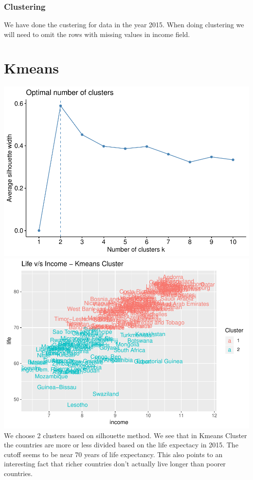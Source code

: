 \documentclass[]{article}
\begin{document}
\hypertarget{clustering}{%
\subsubsection{Clustering}\label{clustering}}

We have done the custering for data in the year 2015. When doing
clustering we will need to omit the rows with missing values in income
field.

\hypertarget{kmeans}{%
\section{Kmeans}\label{kmeans}}

\includegraphics{Final_Project_files/figure-latex/Clustering Kmeans-1.pdf}
\includegraphics{Final_Project_files/figure-latex/Clustering Kmeans-2.pdf}
We choose 2 clusters based on silhouette method. We see that in Kmeans
Cluster the countries are more or less divided based on the life
expectacy in 2015. The cutoff seems to be near 70 years of life
expectancy. This also points to an interesting fact that richer
countries don't actually live longer than poorer countries.
\end{document}
